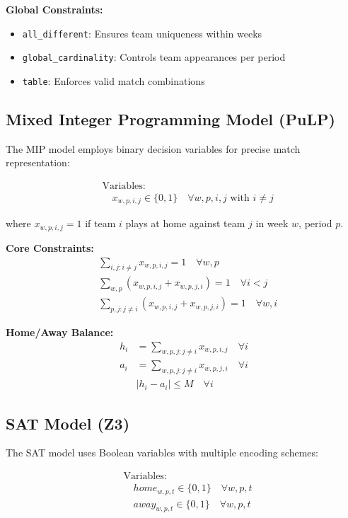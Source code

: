 \documentclass[11pt]{article}
\begin{document}
\textbf{Global Constraints:}
\begin{itemize}
    \item \texttt{all\_different}: Ensures team uniqueness within weeks
    \item \texttt{global\_cardinality}: Controls team appearances per period
    \item \texttt{table}: Enforces valid match combinations
\end{itemize}

\subsection{Mixed Integer Programming Model (PuLP)}

The MIP model employs binary decision variables for precise match representation:

\begin{align}
&\text{Variables:} \\
&\quad x_{w,p,i,j} \in \{0,1\} \quad \forall w,p,i,j \text{ with } i \neq j
\end{align}

where $x_{w,p,i,j} = 1$ if team $i$ plays at home against team $j$ in week $w$, period $p$.

\textbf{Core Constraints:}
\begin{align}
&\sum_{i,j: i \neq j} x_{w,p,i,j} = 1 \quad \forall w,p \\
&\sum_{w,p} (x_{w,p,i,j} + x_{w,p,j,i}) = 1 \quad \forall i < j \\
&\sum_{p,j: j \neq i} (x_{w,p,i,j} + x_{w,p,j,i}) = 1 \quad \forall w,i
\end{align}

\textbf{Home/Away Balance:}
\begin{align}
h_i &= \sum_{w,p,j: j \neq i} x_{w,p,i,j} \quad \forall i \\
a_i &= \sum_{w,p,j: j \neq i} x_{w,p,j,i} \quad \forall i \\
&|h_i - a_i| \leq M \quad \forall i
\end{align}

\subsection{SAT Model (Z3)}

The SAT model uses Boolean variables with multiple encoding schemes:

\begin{align}
&\text{Variables:} \\
&\quad home_{w,p,t} \in \{0,1\} \quad \forall w,p,t \\
&\quad away_{w,p,t} \in \{0,1\} \quad \forall w,p,t
\end{align}
\end{document}

